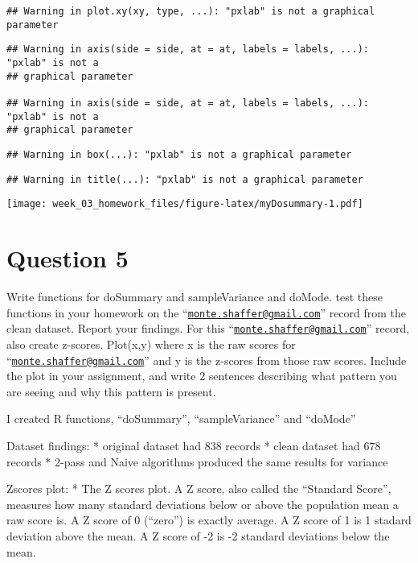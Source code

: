 \documentclass{article}
\begin{document}
\begin{verbatim}
## Warning in plot.xy(xy, type, ...): "pxlab" is not a graphical parameter
\end{verbatim}

\begin{verbatim}
## Warning in axis(side = side, at = at, labels = labels, ...): "pxlab" is not a
## graphical parameter

## Warning in axis(side = side, at = at, labels = labels, ...): "pxlab" is not a
## graphical parameter
\end{verbatim}

\begin{verbatim}
## Warning in box(...): "pxlab" is not a graphical parameter
\end{verbatim}

\begin{verbatim}
## Warning in title(...): "pxlab" is not a graphical parameter
\end{verbatim}

\texttt{[image: week\_03\_homework\_files/figure-latex/myDosummary-1.pdf]}

\newpage

\hypertarget{question-5}{%
\section{Question 5}\label{question-5}}

Write functions for doSummary and sampleVariance and doMode. test these
functions in your homework on the
``\href{mailto:monte.shaffer@gmail.com}{\nolinkurl{monte.shaffer@gmail.com}}''
record from the clean dataset. Report your findings. For this
``\href{mailto:monte.shaffer@gmail.com}{\nolinkurl{monte.shaffer@gmail.com}}''
record, also create z-scores. Plot(x,y) where x is the raw scores for
``\href{mailto:monte.shaffer@gmail.com}{\nolinkurl{monte.shaffer@gmail.com}}''
and y is the z-scores from those raw scores. Include the plot in your
assignment, and write 2 sentences describing what pattern you are seeing
and why this pattern is present.

I created R functions, ``doSummary'', ``sampleVariance'' and ``doMode''

Dataset findings: * original dataset had 838 records * clean dataset had
678 records * 2-pass and Naive algorithms produced the same results for
variance

Zscores plot: * The Z scores plot. A Z score, also called the ``Standard
Score'', measures how many standard deviations below or above the
population mean a raw score is. A Z score of 0 (``zero'') is exactly
average. A Z score of 1 is 1 stadard deviation above the mean. A Z score
of -2 is -2 standard deviations below the mean.
\end{document}

